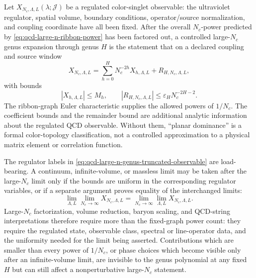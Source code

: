 \begin{controlledapproximation}
\label{ca:qcd-large-n-genus-truncation-remainder-bound}
Let \(X_{N_c,\Lambda,L}(\lambda;\mathcal J)\) be a regulated color-singlet
observable: the ultraviolet regulator, spatial volume, boundary conditions,
operator/source normalization, and coupling coordinate have all been fixed.
After the overall \(N_c\)-power predicted by
\eqref{eq:qcd-large-n-ribbon-power} has been factored out, a controlled
large-\(N_c\) genus expansion through genus \(H\) is the statement that on a
declared coupling and source window
\begin{equation}
  X_{N_c,\Lambda,L}
  =
  \sum_{h=0}^{H}N_c^{-2h}X_{h,\Lambda,L}
  +
  R_{H,N_c,\Lambda,L},
  \label{eq:qcd-large-n-genus-truncated-observable}
\end{equation}
with bounds
\begin{equation}
  |X_{h,\Lambda,L}|\le M_h,
  \qquad
  |R_{H,N_c,\Lambda,L}|
  \le
  \varepsilon_H N_c^{-2H-2}.
  \label{eq:qcd-large-n-genus-truncation-bound}
\end{equation}
The ribbon-graph Euler characteristic supplies the allowed powers of
\(1/N_c\).  The coefficient bounds and the remainder bound are additional
analytic information about the regulated QCD observable.  Without them,
``planar dominance'' is a formal color-topology classification, not a
controlled approximation to a physical matrix element or correlation
function.

The regulator labels in
\eqref{eq:qcd-large-n-genus-truncated-observable} are load-bearing.  A
continuum, infinite-volume, or massless limit may be taken after the
large-\(N_c\) limit only if the bounds are uniform in the corresponding
regulator variables, or if a separate argument proves equality of the
interchanged limits:
\[
  \lim_{\Lambda,L}\lim_{N_c\to\infty}X_{N_c,\Lambda,L}
  =
  \lim_{N_c\to\infty}\lim_{\Lambda,L}X_{N_c,\Lambda,L}.
\]
Large-\(N_c\) factorization, volume reduction, baryon scaling, and QCD-string
interpretations therefore require more than the fixed-graph power count: they
require the regulated state, observable class, spectral or line-operator
data, and the uniformity needed for the limit being asserted.  Contributions
which are smaller than every power of \(1/N_c\), or phase choices which become
visible only after an infinite-volume limit, are invisible to the genus
polynomial at any fixed \(H\) but can still affect a nonperturbative
large-\(N_c\) statement.
\end{controlledapproximation}

